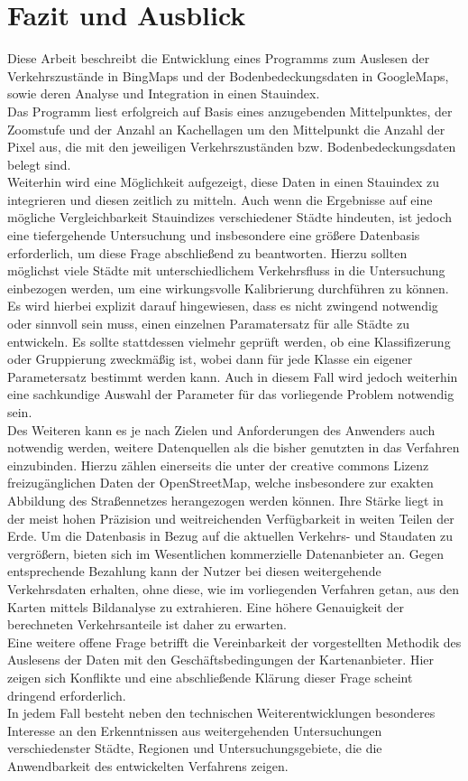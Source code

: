 \section{Fazit und Ausblick}

Diese Arbeit beschreibt die Entwicklung eines Programms zum Auslesen der Verkehrszustände in BingMaps und der Bodenbedeckungsdaten in GoogleMaps, sowie deren Analyse und Integration in einen Stauindex.\\
Das Programm liest erfolgreich auf Basis eines anzugebenden Mittelpunktes, der Zoomstufe und der Anzahl an Kachellagen um den Mittelpunkt die Anzahl der Pixel aus, die mit den jeweiligen Verkehrszuständen bzw. Bodenbedeckungsdaten belegt sind.\\
Weiterhin wird eine Möglichkeit aufgezeigt, diese Daten in einen Stauindex zu integrieren und diesen zeitlich zu mitteln. Auch wenn die Ergebnisse auf eine mögliche Vergleichbarkeit Stauindizes verschiedener Städte hindeuten, ist jedoch eine tiefergehende Untersuchung und insbesondere eine größere Datenbasis erforderlich, um diese Frage abschließend zu beantworten. Hierzu sollten möglichst viele Städte mit unterschiedlichem Verkehrsfluss in die Untersuchung einbezogen werden, um eine wirkungsvolle Kalibrierung durchführen zu können. Es wird hierbei explizit darauf hingewiesen, dass es nicht zwingend notwendig oder sinnvoll sein muss, einen einzelnen Paramatersatz für alle Städte zu entwickeln. Es sollte stattdessen vielmehr geprüft werden, ob eine Klassifizerung oder Gruppierung zweckmäßig ist, wobei dann für jede Klasse ein eigener Parametersatz bestimmt werden kann. Auch in diesem Fall wird jedoch weiterhin eine sachkundige Auswahl der Parameter für das vorliegende Problem notwendig sein.\\

Des Weiteren kann es je nach Zielen und Anforderungen des Anwenders auch notwendig werden, weitere Datenquellen als die bisher genutzten in das Verfahren einzubinden. Hierzu zählen einerseits die unter der creative commons Lizenz freizugänglichen Daten der OpenStreetMap, welche insbesondere zur exakten Abbildung des Straßennetzes herangezogen werden können. Ihre Stärke liegt in der meist hohen Präzision und weitreichenden Verfügbarkeit in weiten Teilen der Erde. Um die Datenbasis in Bezug auf die aktuellen Verkehrs- und Staudaten zu vergrößern, bieten sich im Wesentlichen kommerzielle Datenanbieter an. Gegen entsprechende Bezahlung kann der Nutzer bei diesen weitergehende Verkehrsdaten erhalten, ohne diese, wie im vorliegenden Verfahren getan, aus den Karten mittels Bildanalyse zu extrahieren. Eine höhere Genauigkeit der berechneten Verkehrsanteile ist daher zu erwarten.\\
Eine weitere offene Frage betrifft die Vereinbarkeit der vorgestellten Methodik des Auslesens der Daten mit den Geschäftsbedingungen der Kartenanbieter. Hier zeigen sich Konflikte und eine abschließende Klärung dieser Frage scheint dringend erforderlich.\\

In jedem Fall besteht neben den technischen Weiterentwicklungen besonderes Interesse an den Erkenntnissen aus weitergehenden Untersuchungen verschiedenster Städte, Regionen und Untersuchungsgebiete, die die Anwendbarkeit des entwickelten Verfahrens zeigen.
